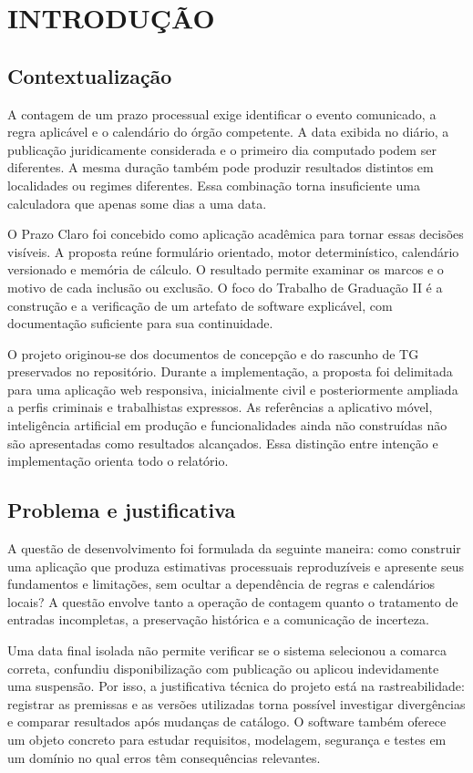 \chapter{INTRODUÇÃO}
\label{chapter-1}
\section{Contextualização}
\label{section-1-1}
A contagem de um prazo processual exige identificar o evento comunicado, a regra aplicável e o calendário do órgão competente. A data exibida no diário, a publicação juridicamente considerada e o primeiro dia computado podem ser diferentes. A mesma duração também pode produzir resultados distintos em localidades ou regimes diferentes. Essa combinação torna insuficiente uma calculadora que apenas some dias a uma data.

O Prazo Claro foi concebido como aplicação acadêmica para tornar essas decisões visíveis. A proposta reúne formulário orientado, motor determinístico, calendário versionado e memória de cálculo. O resultado permite examinar os marcos e o motivo de cada inclusão ou exclusão. O foco do Trabalho de Graduação II é a construção e a verificação de um artefato de software explicável, com documentação suficiente para sua continuidade.

O projeto originou-se dos documentos de concepção e do rascunho de TG preservados no repositório. Durante a implementação, a proposta foi delimitada para uma aplicação web responsiva, inicialmente civil e posteriormente ampliada a perfis criminais e trabalhistas expressos. As referências a aplicativo móvel, inteligência artificial em produção e funcionalidades ainda não construídas não são apresentadas como resultados alcançados. Essa distinção entre intenção e implementação orienta todo o relatório.

\section{Problema e justificativa}
\label{section-1-2}
A questão de desenvolvimento foi formulada da seguinte maneira: como construir uma aplicação que produza estimativas processuais reproduzíveis e apresente seus fundamentos e limitações, sem ocultar a dependência de regras e calendários locais? A questão envolve tanto a operação de contagem quanto o tratamento de entradas incompletas, a preservação histórica e a comunicação de incerteza.

Uma data final isolada não permite verificar se o sistema selecionou a comarca correta, confundiu disponibilização com publicação ou aplicou indevidamente uma suspensão. Por isso, a justificativa técnica do projeto está na rastreabilidade: registrar as premissas e as versões utilizadas torna possível investigar divergências e comparar resultados após mudanças de catálogo. O software também oferece um objeto concreto para estudar requisitos, modelagem, segurança e testes em um domínio no qual erros têm consequências relevantes.

